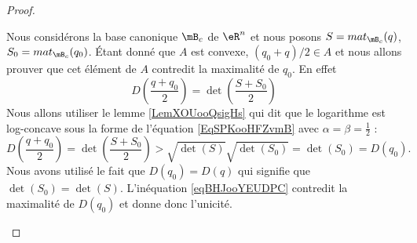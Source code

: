 \begin{proof}
\begin{subproof}
            Nous considérons la base canonique \( \mB_c\) de \( \eR^n\) et nous posons \( S=mat_{\mB_c}(q)\), \( S_0=mat_{\mB_c}(q_0)\). Étant donné que \( A\) est convexe, \( (q_0+q)/2\in A\) et nous allons prouver que cet élément de \( A\) contredit la maximalité de \( q_0\). En effet
            \begin{equation}
                D\left( \frac{ q+q_0 }{ 2 }\right)=\det\left( \frac{ S+S_0 }{2} \right)
            \end{equation}
            Nous allons utiliser le lemme \ref{LemXOUooQsigHs} qui dit que le logarithme est log-concave sous la forme de l'équation \eqref{EqSPKooHFZvmB} avec \( \alpha=\beta=\frac{ 1 }{2}\) :
            \begin{equation}    \label{eqBHJooYEUDPC}
                D\left( \frac{ q+q_0 }{ 2 }\right)=\det\left( \frac{ S+S_0 }{2} \right)>\sqrt{\det(S)}\sqrt{\det(S_0)}=\det(S_0)=D(q_0).
            \end{equation}
            Nous avons utilisé le fait que \( D(q_0)=D(q)\) qui signifie que \( \det(S_0)=\det(S)\). L'inéquation \eqref{eqBHJooYEUDPC} contredit la maximalité de \( D(q_0)\) et donne donc l'unicité.
    \end{subproof}
\end{proof}
